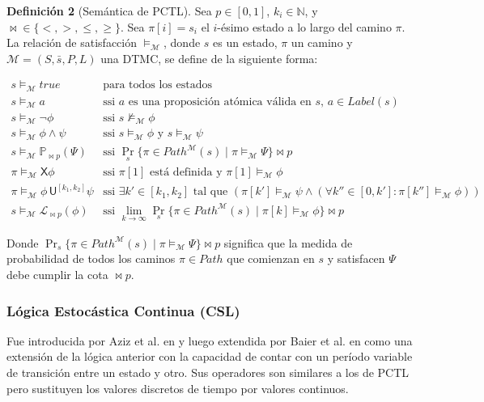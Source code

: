\documentclass{article}
\begin{document}
\textbf{Definición 2} (Semántica de PCTL). Sea $p \in [0,1]$, $k_i \in \mathbb{N}$, y $\bowtie \in \{<, >, \leq, \geq\}$. Sea $\pi[i] = s_i$ el $i$-ésimo estado a lo largo del camino $\pi$. La relación de satisfacción $\models_\mathcal{M}$, donde $s$ es un estado, $\pi$ un camino y $\mathcal{M} = (S, \bar{s}, P, L)$ una DTMC, se define de la siguiente forma:

\[
\begin{array}{ll}
s \models_\mathcal{M} \mathit{true} & \text{para todos los estados} \\
s \models_\mathcal{M} a & \text{ssi $a$ es una proposición atómica válida en $s$, $a \in Label(s)$} \\
s \models_\mathcal{M} \neg \phi & \text{ssi } s \not\models_\mathcal{M} \phi \\
s \models_\mathcal{M} \phi \land \psi & \text{ssi } s \models_\mathcal{M} \phi \text{ y } s \models_\mathcal{M} \psi \\
s \models_\mathcal{M} \mathbb{P}_{\bowtie p}(\Psi) & \text{ssi } \Pr_s\{\pi \in Path^\mathcal{M}(s) \mid \pi \models_\mathcal{M} \Psi\} \bowtie p \\
\pi \models_\mathcal{M} \mathsf{X} \phi & \text{ssi } \pi[1] \text{ está definida y } \pi[1] \models_\mathcal{M} \phi \\
\pi \models_\mathcal{M} \phi \, \mathsf{U}^{[k_1,k_2]} \psi & \text{ssi } \exists k' \in [k_1,k_2] \text{ tal que } (\pi[k'] \models_\mathcal{M} \psi \land (\forall k'' \in [0,k']: \pi[k''] \models_\mathcal{M} \phi)) \\
s \models_\mathcal{M} \mathcal{L}_{\bowtie p}(\phi) & \text{ssi } \lim_{k \to \infty} \Pr_s\{\pi \in Path^\mathcal{M}(s) \mid \pi[k] \models_\mathcal{M} \phi\} \bowtie p
\end{array}
\]

Donde $\Pr_s\{\pi \in Path^\mathcal{M}(s) \mid \pi \models_\mathcal{M} \Psi\} \bowtie p$ significa que la medida de probabilidad de todos los caminos $\pi \in Path$ que comienzan en $s$ y satisfacen $\Psi$ debe cumplir la cota $\bowtie p$.


\subsubsection{Lógica Estocástica Continua (CSL)}

Fue introducida por Aziz et al. en \cite{ASSB96} y luego extendida por Baier et al. en \cite{BKH99} como una extensión de la lógica anterior con la capacidad de contar con un período variable de transición entre un estado y otro. Sus operadores son similares a los de PCTL pero sustituyen los valores discretos de tiempo por valores continuos.\\
\end{document}

